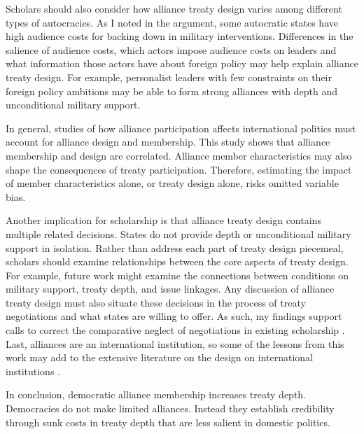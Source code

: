 \documentclass[12pt]{article}
\begin{document}
Scholars should also consider how alliance treaty design varies among different types of autocracies. 
As I noted in the argument, some autocratic states have high audience costs for backing down in military interventions. 
Differences in the salience of audience costs, which actors impose audience costs on leaders and what information those actors have about foreign policy \citep{Weeks2008} may help explain alliance treaty design.
For example, personalist leaders with few constraints on their foreign policy ambitions may be able to form strong alliances with depth and unconditional military support. 


In general, studies of how alliance participation affects international politics must account for alliance design and membership. 
This study shows that alliance membership and design are correlated. 
Alliance member characteristics may also shape the consequences of treaty participation.  
Therefore, estimating the impact of member characteristics alone, or treaty design alone, risks omitted variable bias. 


Another implication for scholarship is that alliance treaty design contains multiple related decisions. 
States do not provide depth or unconditional military support in isolation. 
Rather than address each part of treaty design piecemeal, scholars should examine relationships between the core aspects of treaty design. 
For example, future work might examine the connections between conditions on military support, treaty depth, and issue linkages.  
Any discussion of alliance treaty design must also situate these decisions in the process of treaty negotiations and what states are willing to offer.
As such, my findings support calls to correct the comparative neglect of negotiations in existing scholarship \citep{Poast2019a}. 
Last, alliances are an international institution, so some of the lessons from this work may add to the extensive literature on the design on international institutions \citep{DownesRocke1995, MartinSimmons1998, Koremenosetal2001, Koremenos2005, Thompson2010}.


In conclusion, democratic alliance membership increases treaty depth.  
Democracies do not make limited alliances.
Instead they establish credibility through sunk costs in treaty depth that are less salient in domestic politics. 



\singlespace
 
 
\end{document}
